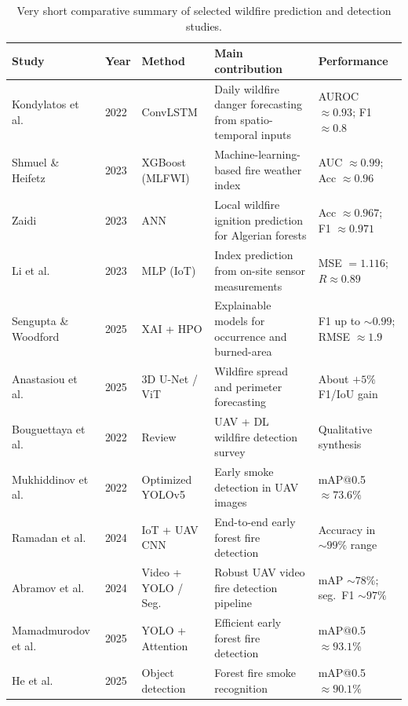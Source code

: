 \begin{table}[h!]
\centering
\caption{Very short comparative summary of selected wildfire prediction and detection studies.}
\label{tab:lit-summary}
\small
\begin{tabular}{@{}llp{2.4cm}p{4.3cm}p{3.2cm}@{}}
\toprule
Study & Year & Method & Main contribution & Performance \\
\midrule
Kondylatos et al.~\cite{kondylatos2022} & 2022 & ConvLSTM & Daily wildfire danger forecasting from spatio-temporal inputs & AUROC $\approx 0.93$; F1 $\approx 0.8$ \\
Shmuel \& Heifetz~\cite{shmuel2023} & 2023 & XGBoost (MLFWI) & Machine-learning-based fire weather index & AUC $\approx 0.99$; Acc $\approx 0.96$ \\
Zaidi~\cite{zaidi2023} & 2023 & ANN & Local wildfire ignition prediction for Algerian forests & Acc $\approx 0.967$; F1 $\approx 0.971$ \\
Li et al.~\cite{li2023} & 2023 & MLP (IoT) & Index prediction from on-site sensor measurements & MSE $= 1.116$; $R \approx 0.89$ \\
Sengupta \& Woodford~\cite{sengupta2025} & 2025 & XAI + HPO & Explainable models for occurrence and burned-area & F1 up to $\sim 0.99$; RMSE $\approx 1.9$ \\
Anastasiou et al.~\cite{anastasiou2025} & 2025 & 3D U-Net / ViT & Wildfire spread and perimeter forecasting & About $+5\%$ F1/IoU gain \\
Bouguettaya et al.~\cite{bouguettaya2022} & 2022 & Review & UAV + DL wildfire detection survey & Qualitative synthesis \\
Mukhiddinov et al.~\cite{mukhiddinov2022} & 2022 & Optimized YOLOv5 & Early smoke detection in UAV images & mAP@0.5 $\approx 73.6\%$ \\
Ramadan et al.~\cite{ramadan2024} & 2024 & IoT + UAV CNN & End-to-end early forest fire detection & Accuracy in $\sim 99\%$ range \\
Abramov et al.~\cite{abramov2024} & 2024 & Video + YOLO / Seg. & Robust UAV video fire detection pipeline & mAP $\sim 78\%$; seg.\ F1 $\sim 97\%$ \\
Mamadmurodov et al.~\cite{mamadmurodov2025} & 2025 & YOLO + Attention & Efficient early forest fire detection & mAP@0.5 $\approx 93.1\%$ \\
He et al.~\cite{he2025} & 2025 & Object detection & Forest fire smoke recognition & mAP@0.5 $\approx 90.1\%$ \\
\bottomrule
\end{tabular}
\end{table}

\clearpage
